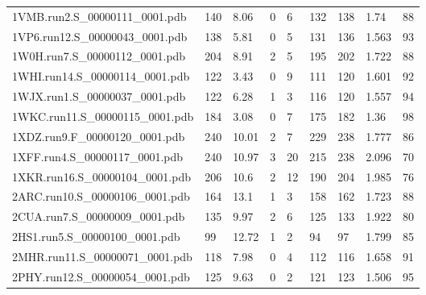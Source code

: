 \documentclass{bioinfo}
\begin{document}
\begin{table}[!t]
{\begin{tabular}{lllllllll}
    1VMB.run2.S\_00000111\_0001.pdb & 140      & 8.06       & 0           & 6           & 132         & 138     & 1.74            & 88           \\
    1VP6.run12.S\_00000043\_0001.pdb & 138      & 5.81       & 0           & 5           & 131         & 136     & 1.563           & 93           \\
    1W0H.run7.S\_00000112\_0001.pdb & 204      & 8.91       & 2           & 5           & 195         & 202     & 1.722           & 88           \\
    1WHI.run14.S\_00000114\_0001.pdb & 122      & 3.43       & 0           & 9           & 111         & 120     & 1.601           & 92           \\
    1WJX.run1.S\_00000037\_0001.pdb & 122      & 6.28       & 1           & 3           & 116         & 120     & 1.557           & 94           \\
    1WKC.run11.S\_00000115\_0001.pdb & 184      & 3.08       & 0           & 7           & 175         & 182     & 1.36            & 98           \\
    1XDZ.run9.F\_00000120\_0001.pdb & 240      & 10.01      & 2           & 7           & 229         & 238     & 1.777           & 86           \\
    1XFF.run4.S\_00000117\_0001.pdb & 240      & 10.97      & 3           & 20          & 215         & 238     & 2.096           & 70           \\
    1XKR.run16.S\_00000104\_0001.pdb & 206      & 10.6       & 2           & 12          & 190         & 204     & 1.985           & 76           \\
    2ARC.run10.S\_00000106\_0001.pdb & 164      & 13.1       & 1           & 3           & 158         & 162     & 1.723           & 88           \\
    2CUA.run7.S\_00000009\_0001.pdb & 135      & 9.97       & 2           & 6           & 125         & 133     & 1.922           & 80           \\
    2HS1.run5.S\_00000100\_0001.pdb & 99       & 12.72      & 1           & 2           & 94          & 97      & 1.799           & 85           \\
    2MHR.run11.S\_00000071\_0001.pdb & 118      & 7.98       & 0           & 4           & 112         & 116     & 1.658           & 91           \\
    2PHY.run12.S\_00000054\_0001.pdb & 125      & 9.63       & 0           & 2           & 121         & 123     & 1.506           & 95           \\

\end{tabular}}
\end{table}
\end{document}
